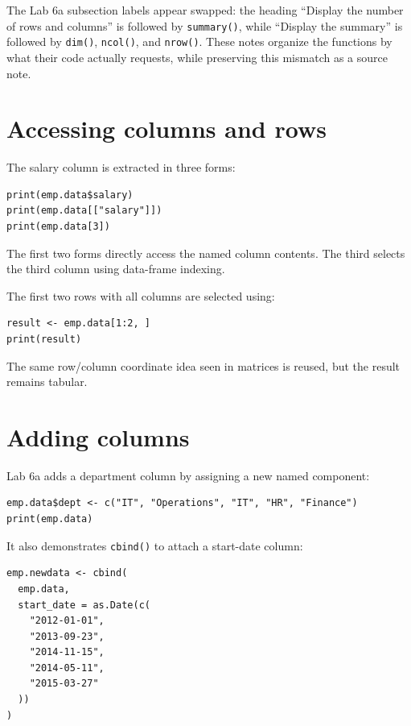 \begin{pitfall}
The Lab 6a subsection labels appear swapped: the heading ``Display the number of rows and columns'' is followed by \texttt{summary()}, while ``Display the summary'' is followed by \texttt{dim()}, \texttt{ncol()}, and \texttt{nrow()}. These notes organize the functions by what their code actually requests, while preserving this mismatch as a source note.
\end{pitfall}

\section{Accessing columns and rows}

The salary column is extracted in three forms:

\begin{lstlisting}[style=dsr]
print(emp.data$salary)
print(emp.data[["salary"]])
print(emp.data[3])
\end{lstlisting}

The first two forms directly access the named column contents. The third selects the third column using data-frame indexing.

The first two rows with all columns are selected using:

\begin{lstlisting}[style=dsr]
result <- emp.data[1:2, ]
print(result)
\end{lstlisting}

The same row/column coordinate idea seen in matrices is reused, but the result remains tabular.

\section{Adding columns}

Lab 6a adds a department column by assigning a new named component:

\begin{lstlisting}[style=dsr]
emp.data$dept <- c("IT", "Operations", "IT", "HR", "Finance")
print(emp.data)
\end{lstlisting}

It also demonstrates \texttt{cbind()} to attach a start-date column:

\begin{lstlisting}[style=dsr]
emp.newdata <- cbind(
  emp.data,
  start_date = as.Date(c(
    "2012-01-01",
    "2013-09-23",
    "2014-11-15",
    "2014-05-11",
    "2015-03-27"
  ))
)
\end{lstlisting}

